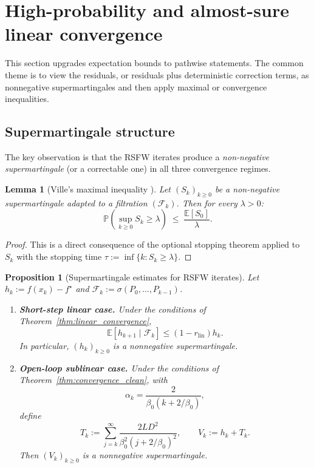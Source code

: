 \documentclass{article}
\newtheorem{lemma}{Lemma}
\newtheorem{proposition}{Proposition}
\begin{document}
\section{High-probability and almost-sure linear convergence}
\label{app:hp-linear}

This section upgrades expectation bounds to pathwise statements. The common
theme is to view the residuals, or residuals plus deterministic correction
terms, as nonnegative supermartingales and then apply maximal or convergence
inequalities.

\subsection{Supermartingale structure}

The key observation is that the RSFW iterates produce a
\emph{non-negative supermartingale} (or a correctable one) in all
three convergence regimes.

\begin{lemma}[Ville's maximal inequality {\cite[p.~100]{Ville1939}}]
\label{lem:Ville}
Let $(S_k)_{k\ge 0}$ be a non-negative supermartingale
adapted to a filtration $(\mathcal F_k)$.
Then for every $\lambda>0$:
\[
\mathbb P\!\left(\sup_{k\ge 0}S_k\ge\lambda\right)
\;\le\;\frac{\mathbb E[S_0]}{\lambda}.
\]
\end{lemma}

\begin{proof}
This is a direct consequence of the optional stopping theorem
applied to $S_k$ with the stopping time
$\tau:=\inf\{k:S_k\ge\lambda\}$.
\end{proof}

\begin{proposition}[Supermartingale estimates for RSFW iterates]
\label{prop:supermartingale}
Let \(h_k:=f(x_k)-f^\star\) and
\(\mathcal F_k:=\sigma(P_0,\ldots,P_{k-1})\).

\begin{enumerate}
\item[\textup{(i)}]
\textbf{Short-step linear case.}
Under the conditions of Theorem~\ref{thm:linear_convergence},
\[
\mathbb E[h_{k+1}\mid\mathcal F_k]
\le
(1-r_{\mathrm{lin}})h_k.
\]
In particular, \((h_k)_{k\ge0}\) is a nonnegative supermartingale.

\item[\textup{(ii)}]
\textbf{Open-loop sublinear case.}
Under the conditions of Theorem~\ref{thm:convergence_clean}, with
\[
\alpha_k=\frac{2}{\beta_0(k+2/\beta_0)},
\]
define
\[
T_k
:=
\sum_{j=k}^{\infty}
\frac{2LD^2}{\beta_0^2(j+2/\beta_0)^2},
\qquad
V_k:=h_k+T_k.
\]
Then \((V_k)_{k\ge0}\) is a nonnegative supermartingale.
\end{enumerate}
\end{proposition}
\end{document}
